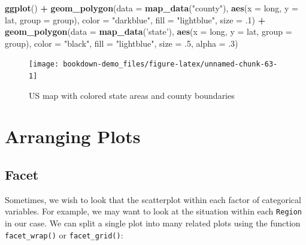 \documentclass[]{book}
\newenvironment{Shaded}{\begin{snugshade}}{\end{snugshade}}
\newcommand{\KeywordTok}[1]{\textcolor[rgb]{0.13,0.29,0.53}{\textbf{#1}}}
\newcommand{\DataTypeTok}[1]{\textcolor[rgb]{0.13,0.29,0.53}{#1}}
\newcommand{\DecValTok}[1]{\textcolor[rgb]{0.00,0.00,0.81}{#1}}
\newcommand{\StringTok}[1]{\textcolor[rgb]{0.31,0.60,0.02}{#1}}
\newcommand{\OperatorTok}[1]{\textcolor[rgb]{0.81,0.36,0.00}{\textbf{#1}}}
\newcommand{\NormalTok}[1]{#1}
\begin{document}
\begin{Shaded}
\begin{Highlighting}[]
\KeywordTok{ggplot}\NormalTok{() }\OperatorTok{+}\StringTok{ }\KeywordTok{geom_polygon}\NormalTok{(}\DataTypeTok{data =} \KeywordTok{map_data}\NormalTok{(}\StringTok{"county"}\NormalTok{), }
                \KeywordTok{aes}\NormalTok{(}\DataTypeTok{x =}\NormalTok{ long, }\DataTypeTok{y =}\NormalTok{ lat, }\DataTypeTok{group =}\NormalTok{ group),}
                \DataTypeTok{color =} \StringTok{"darkblue"}\NormalTok{, }
                \DataTypeTok{fill =} \StringTok{"lightblue"}\NormalTok{, }\DataTypeTok{size =}\NormalTok{ .}\DecValTok{1}\NormalTok{) }\OperatorTok{+}\StringTok{ }
\StringTok{  }
\StringTok{            }\KeywordTok{geom_polygon}\NormalTok{(}\DataTypeTok{data =} \KeywordTok{map_data}\NormalTok{(}\StringTok{'state'}\NormalTok{), }
                       \KeywordTok{aes}\NormalTok{(}\DataTypeTok{x =}\NormalTok{ long, }\DataTypeTok{y =}\NormalTok{ lat, }\DataTypeTok{group =}\NormalTok{ group),}
                \DataTypeTok{color =} \StringTok{"black"}\NormalTok{, }\DataTypeTok{fill =} \StringTok{"lightblue"}\NormalTok{,  }
                \DataTypeTok{size =}\NormalTok{ .}\DecValTok{5}\NormalTok{, }\DataTypeTok{alpha =}\NormalTok{ .}\DecValTok{3}\NormalTok{) }
\end{Highlighting}
\end{Shaded}

\begin{figure}

{\centering \texttt{[image: bookdown-demo\_files/figure-latex/unnamed-chunk-63-1]} 

}

\caption{US map with colored state areas and county boundaries}\label{fig:unnamed-chunk-63}
\end{figure}

\section{Arranging Plots}\label{arranging-plots}

\subsection{Facet}\label{facet}

Sometimes, we wish to look that the scatterplot within each factor of
categorical variables. For example, we may want to look at the situation
within each \texttt{Region} in our case. We can split a single plot into
many related plots using the function \texttt{facet\_wrap()} or
\texttt{facet\_grid()}:
\end{document}
